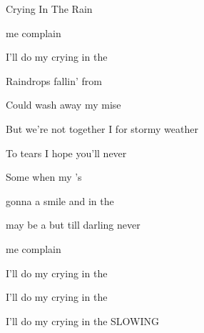 \begin{SBSong}{Crying In The Rain}
\begin{SBVerse}
     me complain  
    
    I'll do my crying in the    
  \end{SBVerse}
  \CBPageBrk
  \begin{SBChorus}
     Raindrops fallin' from  
    
    Could  wash away my mise
    
    But  we're not together I  for stormy weather 
    
    To   tears I hope you'll never  
  \end{SBChorus}
  
  \begin{SBVerse}
     Some  when my 's 
    
     gonna  a smile and  in the  
    
     may be a  but till  darling  never 
    
     me complain  
    
    I'll do my crying in the    
    
    I'll do my crying in the    
    
    I'll do my crying in the     SLOWING
  \end{SBVerse}
\end{SBSong}
